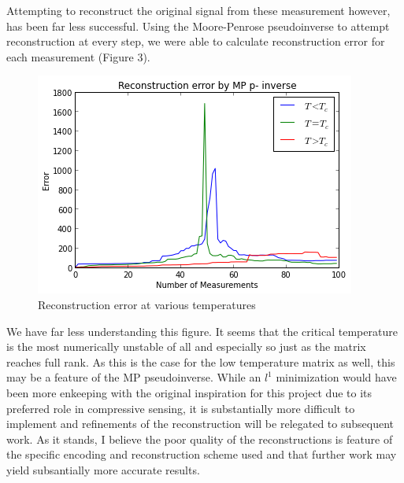 \documentclass{article} %
\begin{document}
Attempting to reconstruct the original signal from these measurement however, has
been far less successful.  Using the Moore-Penrose pseudoinverse to attempt
reconstruction at every step, we were able to calculate reconstruction error
for each measurement (Figure 3).  
\begin{figure}[h]
\begin{center}
\includegraphics[width=0.5\linewidth]{errors.png}
\end{center}
\caption{Reconstruction error at various temperatures}
\end{figure}
We have far less understanding this figure.  It seems that the critical temperature
is the most numerically unstable of all and especially so just as the matrix reaches
full rank.  As this is the case for the low temperature matrix as well, this may be
a feature of the MP pseudoinverse.  While an $l^1$ minimization would have been more
enkeeping with the original inspiration for this project due to its preferred role
in compressive sensing, it is substantially more difficult to implement and refinements
of the reconstruction will be relegated to subsequent work. As it stands, I believe
the poor quality of the reconstructions is feature of the specific encoding and 
reconstruction scheme used and that further work may yield subsantially more accurate results.

\end{document}
